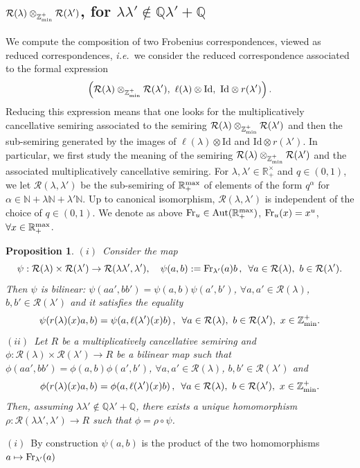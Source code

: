 \documentclass[noams,lp]{compositio}
\newtheorem{prop}[thm]{Proposition}
\def\Aut{{\rm Aut}}
\def\id{{\rm id}}
\def\N{{\mathbb N}}
\def\Q{{\mathbb Q}}
\def\R{{\mathbb R}}
\def\Z{{\mathbb Z}}
\def\cR{{\mathcal R}}
\def\qqq{\,,\,~\forall}
\newcommand{\ie}{{\it i.e.\/}\ }
\def\zminp{\Z_{\rm min}^+}
\def\id{{\mbox{Id}}}
\def\mc{multiplicatively cancellative }
\def\rmax{\R_+^{\rm max}}
\def\fr{{\rm Fr}}
\begin{document}
\subsection{$\cR(\lambda)\otimes_{\zminp} \cR(\lambda')$, for $\lambda\lambda'\notin \Q\lambda'+\Q$}
We compute the composition of two Frobenius correspondences, viewed as reduced correspondences, \ie we consider the reduced correspondence associated to the formal expression
$$
\left(\cR(\lambda)\otimes_{\zminp} \cR(\lambda'), \   \ell(\lambda)\otimes \id, \  \id\otimes r(\lambda')\right).
$$
Reducing this expression means that one looks for the \mc semiring associated to the semiring  $\cR(\lambda)\otimes_{\zminp} \cR(\lambda')$ and then the sub-semiring generated by the images of  $\ell(\lambda)\otimes \id$ and $\id\otimes r(\lambda')$. In particular, we first study the meaning of the semiring $\cR(\lambda)\otimes_{\zminp} \cR(\lambda')$ and the associated \mc semiring. For $\lambda, \lambda'\in \R_+^\times$ and $q\in (0,1)$, we let $\cR(\lambda,\lambda')$ be the sub-semiring of $\rmax$ of elements of the form $q^\alpha$ for $\alpha \in \N+\lambda\N+\lambda'\N$. Up to canonical isomorphism, $\cR(\lambda,\lambda')$ is independent of the choice of $q\in (0,1)$. We denote as above  $\fr_u\in \Aut(\rmax)$, $\fr_u(x)=x^u$, $\forall x\in \rmax$. 
\begin{prop}\label{frobcorres1} 
$(i)$~Consider the map  
$$
\psi:\cR(\lambda)\times\cR(\lambda')\to \cR(\lambda\lambda',\lambda'),\quad \psi(a,b):=\fr_{\lambda'}(a)b\qqq a\in \cR(\lambda),\ b\in \cR(\lambda').
$$
Then $\psi$ is bilinear: $\psi(aa',bb')=\psi(a,b)\psi(a',b')$, $\forall a,a' \in \cR(\lambda)$, $b,b' \in \cR(\lambda')$ and it satisfies the equality
$$
\psi(r(\lambda)(x)a,b)=\psi(a,\ell(\lambda')(x)b)\qqq a\in \cR(\lambda),\ b\in \cR(\lambda'), \ x\in \zminp.
$$
$(ii)$~Let $R$ be a \mc semiring and $\phi:\cR(\lambda)\times\cR(\lambda')\to R$ be a bilinear map such that
$\phi(aa',bb')=\phi(a,b)\phi(a',b')$, $\forall a,a' \in \cR(\lambda)$, $b,b' \in \cR(\lambda')$ and
\begin{equation}\label{hypo1}
\phi(r(\lambda)(x)a,b)=\phi(a,\ell(\lambda')(x)b)\qqq a\in \cR(\lambda),\ b\in \cR(\lambda'), \ x\in \zminp.
\end{equation}
Then, assuming  $\lambda\lambda'\notin \Q\lambda'+\Q$,  there exists a unique homomorphism $\rho: \cR(\lambda\lambda',\lambda')\to R$ such that $\phi=\rho\circ\psi$.
\end{prop}
\proof $(i)$~By construction $\psi(a,b)$ is the product of the two homomorphisms $a\mapsto \fr_{\lambda'}(a)$
\end{document}
